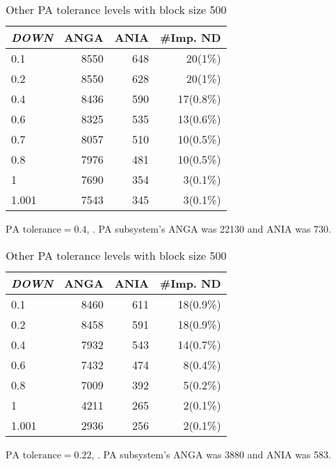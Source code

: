 \begin{table}[ht]
\centering
\begin{subtable}[h]{0.45\textwidth}
\begin{tabular}{lrrr}
\hline
\textit{DOWN} & ANGA  & ANIA & \#Imp. ND \\ \hline
0.1   & 8550 & 648 & 20(1\%)   \\
0.2   & 8550 & 628 & 20(1\%)   \\
0.4   & 8436 & 590 & 17(0.8\%) \\
0.6   & 8325 & 535 & 13(0.6\%) \\
0.7   & 8057 & 510 & 10(0.5\%) \\
0.8   & 7976 & 481 & 10(0.5\%) \\
1     & 7690 & 354 & 3(0.1\%)  \\
1.001 & 7543 & 345 & 3(0.1\%)

\end{tabular}
 \caption{$\text{PA tolerance} = 0.4$, . PA subsystem's ANGA was 22130 and ANIA was 730.}
 \label{tab:app-BL500-tol-0.4}
\end{subtable}
\hfill
\begin{subtable}[h]{0.45\textwidth}
\centering
\begin{tabular}{lrrr}
\hline
\textit{DOWN} & ANGA  & ANIA & \#Imp. ND  \\ \hline
0.1   & 8460 & 611 & 18(0.9\%) \\
0.2   & 8458 & 591 & 18(0.9\%) \\
0.4   & 7932 & 543 & 14(0.7\%) \\
0.6   & 7432 & 474 & 8(0.4\%)  \\
0.8   & 7009 & 392 & 5(0.2\%)  \\
1     & 4211 & 265 & 2(0.1\%)  \\
1.001 & 2936 & 256 & 2(0.1\%) 

 \end{tabular}
 \caption{$\text{PA tolerance} = 0.22$, . PA subsystem's ANGA was 3880 and ANIA was 583.}
\label{tab:app-BL500-tol-0.22}
\end{subtable}

\caption{Other PA tolerance levels with block size 500}
\label{tab:app-BL500-diffANGAs}
\end{table}



